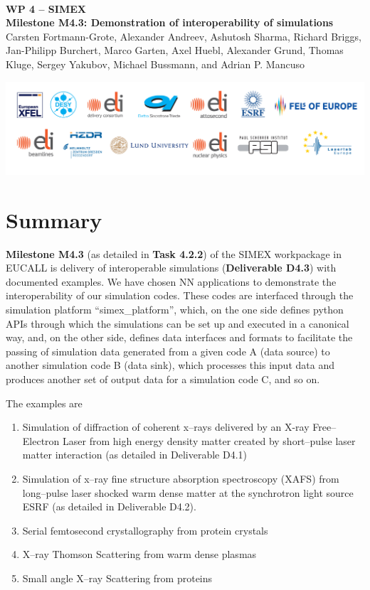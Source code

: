 \documentclass[12pt]{scrartcl}
\begin{document}
\makeatletter
\begin{titlepage}
\thispagestyle{scrheadings}
\begin{center}
  $~$\\
  \vspace{2cm}
  \Huge{\textbf{WP 4 -- SIMEX\\[1cm]
    Milestone M4.3: Demonstration of interoperability of simulations%
  }}\\
  \vspace{2cm}
  \large{Carsten Fortmann-Grote, Alexander Andreev, Ashutosh Sharma, Richard
    Briggs, Jan-Philipp Burchert, Marco Garten, Axel Huebl, Alexander Grund,
  Thomas Kluge, Sergey Yakubov, Michael Bussmann, and Adrian P. Mancuso}
  \vspace{1cm}
  \date{\today}
\end{center}
\vfill%
\includegraphics[width=\textwidth]{figures/PartnerLogos_2017}
\normalfont
\end{titlepage}
\makeatother
%
\tableofcontents
%
\section{Summary}\label{sec:summary}
\textbf{Milestone M4.3} (as detailed in \textbf{Task 4.2.2}) of the SIMEX
workpackage in EUCALL is delivery of interoperable simulations
(\textbf{Deliverable D4.3}) with documented examples. We have chosen NN
applications to demonstrate the interoperability of our simulation codes. These
codes are interfaced through the simulation platform ``simex\_platform'', which,
on the one side defines python APIs through which the simulations can be set up
and executed in a canonical way, and, on the other side, defines data interfaces
and formats to facilitate the passing of simulation data generated from a given
code A (data source) to another simulation code B (data sink), which processes
this input data and produces another set of output data for a simulation code C,
and so on.

The examples are
\begin{enumerate}
  \item Simulation of diffraction of coherent x--rays delivered by an X-ray
    Free--Electron Laser from high energy density matter created by short--pulse
    laser matter interaction (as detailed in Deliverable D4.1)
  \item Simulation of x--ray fine structure absorption spectroscopy (XAFS) from long--pulse laser
    shocked warm dense matter at the synchrotron light source ESRF (as detailed
    in Deliverable D4.2).
  \item Serial femtosecond crystallography from protein crystals
  \item X--ray Thomson Scattering from warm dense plasmas
  \item Small angle X--ray Scattering from proteins
\end{enumerate}
\end{document}
